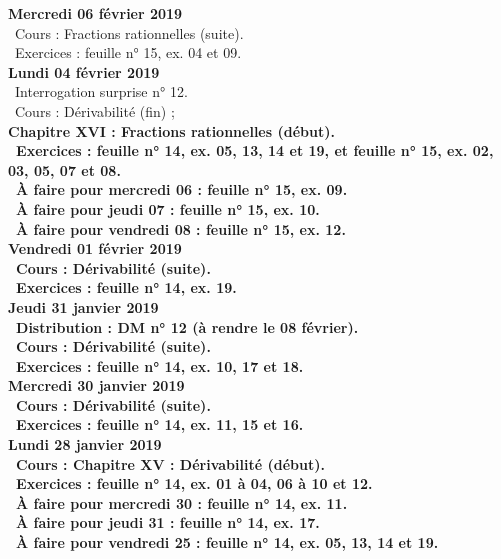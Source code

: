 \documentclass[12pt,a4paper]{article}
\begin{document}
\noindent\textbf{Mercredi 06 février 2019} \\
\bu\ Cours : Fractions rationnelles (suite).\\
\bu\ Exercices : feuille n° 15, ex. 04 et 09.\vspace{.4cm}\\
 
\noindent\textbf{\bf Lundi 04 février 2019} \\
\bu\ Interrogation surprise n° 12.\\
\bu\ Cours :  Dérivabilité (fin) ;\\
\bf Chapitre XVI \rm : Fractions rationnelles (début).\\
\bu\ Exercices : feuille n° 14, ex. 05, 13, 14 et 19, et feuille n° 15, ex. 02, 03, 05, 07 et 08.\\
\bu\ À faire pour mercredi 06 : feuille n° 15, ex. 09.\\
\bu\ À faire pour jeudi 07 : feuille n° 15, ex. 10.\\
\bu\ À faire pour vendredi 08 : feuille n° 15, ex. 12.\vspace{.4cm}\\
 
\noindent\textbf{Vendredi 01 février 2019}\\
\bu\ Cours : Dérivabilité (suite).\\
\bu\ Exercices : feuille n° 14, ex. 19.\vspace{.4cm}\\
 
\noindent\textbf{Jeudi 31 janvier 2019}\\
\bu\ Distribution : DM n° 12 (à rendre le 08 février).\\
\bu\ Cours : Dérivabilité (suite).\\
\bu\ Exercices : feuille n° 14, ex. 10, 17 et 18.\vspace{.4cm}\\
 
\noindent\textbf{Mercredi 30 janvier 2019} \\
\bu\ Cours : Dérivabilité (suite).\\
\bu\ Exercices : feuille n° 14, ex. 11, 15 et 16.\vspace{.4cm}\\
 
\noindent\textbf{Lundi 28 janvier 2019} \\
\bu\ Cours : \bf Chapitre XV \rm : Dérivabilité (début).\\
\bu\ Exercices : feuille n° 14, ex. 01 à 04, 06 à 10 et 12.\\
\bu\ À faire pour mercredi 30 : feuille n° 14, ex. 11.\\
\bu\ À faire pour jeudi 31 : feuille n° 14, ex. 17.\\
\bu\ À faire pour vendredi 25 : feuille n° 14, ex. 05, 13, 14 et 19.\vspace{.4cm}\\
 
\end{document}
